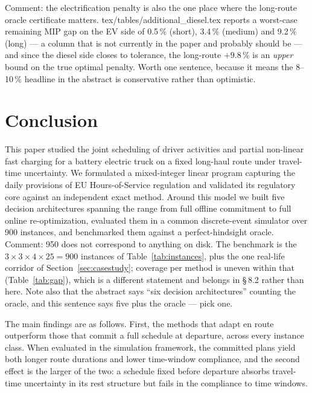 \documentclass[preprint,12pt,3p]{elsarticle}
\newcommand{\green}[1]{{\color{darkgreen}#1}}
\newcommand{\blue}[1]{{\color{darkblue}#1}}
\begin{document}
\green{Comment: the electrification penalty is also the one place where the long-route
oracle certificate matters. tex/tables/additional\_diesel.tex reports a worst-case
remaining MIP gap on the EV side of 0.5\,\% (short), 3.4\,\% (medium) and 9.2\,\% (long)
--- a column that is not currently in the paper and probably should be --- and since
the diesel side closes to tolerance, the long-route $+9.8\,\%$ is an \emph{upper} bound on
the true optimal penalty. Worth one sentence, because it means the 8--10\,\% headline
in the abstract is conservative rather than optimistic.}

\section{Conclusion} \label{section:conclusion}

This paper studied the joint scheduling of driver activities and partial non-linear fast charging for a battery electric truck on a fixed long-haul route under travel-time uncertainty. We formulated a mixed-integer linear program capturing the daily provisions of EU Hours-of-Service regulation and validated its regulatory core against an independent exact method. Around this model we built five decision architectures spanning the range from full offline commitment to full online re-optimization, evaluated them in a common discrete-event simulator over \blue{900} instances, and benchmarked them against a perfect-hindsight oracle.
\green{Comment: 950 does not correspond to anything on disk. The benchmark is the
$3 \times 3 \times 4 \times 25 = 900$ instances of Table~\ref{tab:instances}, plus the one real-life
corridor of Section~\ref{sec:casestudy}; coverage per method is uneven within that
(Table~\ref{tab:gap}), which is a different statement and belongs in \S\,8.2 rather
than here. Note also that the abstract says ``six decision architectures'' counting
the oracle, and this sentence says five plus the oracle --- pick one.}

{\color{red}
The main findings are as follows. First, the methods that adapt en route outperform those that commit a full schedule at departure, across every instance class. When evaluated in the simulation framework, the committed plans yield both longer route durations and lower time-window compliance, and the second effect is the larger of the two: a schedule fixed before departure absorbs travel-time uncertainty in its rest structure but fails in the compliance to time windows.}
\end{document}
